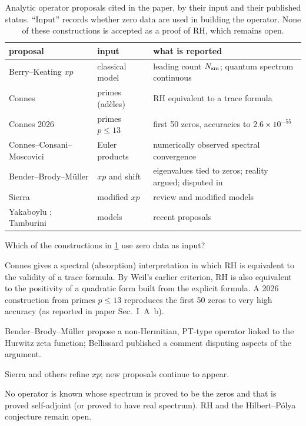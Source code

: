 \begin{table}[htbp]\centering
\caption{Analytic operator proposals cited in the paper, by their input and their published status. ``Input'' records whether zero data are used in building the operator. None of these constructions is accepted as a proof of RH, which remains open.}
\label{tab:hilbert-polya-proposals}
\begin{tabular}{lll}
\toprule
proposal & input & what is reported\\
\midrule
Berry--Keating $xp$ \cite{berrykeating99} & classical model & leading count $N_{\mathrm{sm}}$; quantum spectrum continuous\\
Connes \cite{connes} & primes (ad\`eles) & RH equivalent to a trace formula\\
Connes 2026 \cite{connes26} & primes $p\le13$ & first 50 zeros, accuracies to $2.6\times10^{-55}$\\
Connes--Consani--Moscovici \cite{zetatriples} & Euler products & numerically observed spectral convergence\\
Bender--Brody--M\"uller \cite{bbm} & $xp$ and shift & eigenvalues tied to zeros; reality argued; disputed in \cite{bellissard}\\
Sierra \cite{sierra} & modified $xp$ & review and modified models\\
Yakaboylu \cite{recenthp1}; Tamburini \cite{recenthp2} & models & recent proposals\\
\bottomrule
\end{tabular}
\end{table}

\begin{checkpoint}
Which of the constructions in \cref{tab:hilbert-polya-proposals} use zero data as input?
\end{checkpoint}

\begin{keyideas}
\item Connes gives a spectral (absorption) interpretation in which RH is equivalent to the validity of a trace formula. By Weil's earlier criterion, RH is also equivalent to the positivity of a quadratic form built from the explicit formula. A 2026 construction from primes $p\le13$ reproduces the first 50 zeros to very high accuracy (as reported in paper Sec.~I~A~b).
\item Bender--Brody--M\"uller propose a non-Hermitian, PT-type operator linked to the Hurwitz zeta function; Bellissard published a comment disputing aspects of the argument.
\item Sierra and others refine $xp$; new proposals continue to appear.
\item No operator is known whose spectrum is proved to be the zeros and that is proved self-adjoint (or proved to have real spectrum). RH and the Hilbert--P\'olya conjecture remain open.
\end{keyideas}

